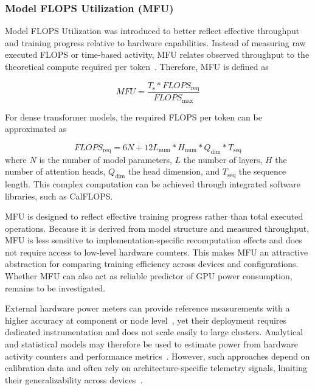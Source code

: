 \documentclass[runningheads]{llncs}
\begin{document}
\subsubsection{Model FLOPS Utilization (MFU)}
Model FLOPS Utilization was introduced to better reflect effective throughput and training progress relative to hardware capabilities. Instead of measuring raw executed FLOPS or time-based activity, MFU relates observed throughput to the theoretical compute required per token~\cite{pope-2022, google-no-date}. Therefore, MFU is defined as

\begin{equation*}
    MFU = \frac{T_\text{s} * FLOPS_{\text{req}}}{FLOPS_{\text{max}}}
\end{equation*}
\cite{chowdhery-2023,ray-2025}

For dense transformer models, the required FLOPS per token can be approximated as

\begin{equation*}
    FLOPS_{\text{req}} = 6N + 12L_{\text{num}}*H_{\text{num}}*Q_{\text{dim}}*T_{\text{seq}}
\end{equation*}
\cite{chowdhery-2023}
where $N$ is the number of model parameters, $L$ the number of layers, $H$ the number of attention heads, $Q_\text{dim}$ the head dimension, and $T_\text{seq}$ the sequence length. This complex computation can be achieved through integrated software libraries, such as CalFLOPS.

MFU is designed to reflect effective training progress rather than total executed operations. Because it is derived from model structure and measured throughput, MFU is less sensitive to implementation-specific recomputation effects and does not require access to low-level hardware counters. This makes MFU an attractive abstraction for comparing training efficiency across devices and configurations. Whether MFU can also act as reliable predictor of GPU power consumption, remains to be investigated.

External hardware power meters can provide reference measurements with a higher accuracy at component or node level~\cite{yang-2024A, jay-2023}, yet their deployment requires dedicated instrumentation and does not scale easily to large clusters. Analytical and statistical models may therefore be used to estimate power from hardware activity counters and performance metrics~\cite{lang-2013}. However, such approaches depend on calibration data and often rely on architecture-specific telemetry signals, limiting their generalizability across devices~\cite{yang-2024A}.
\end{document}
